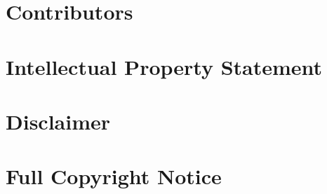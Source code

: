 \documentclass[10pt,a4paper]{article}
\begin{document}
\section{Contributors}


\section{Intellectual Property Statement}


\section{Disclaimer}


\section{Full Copyright Notice}




\end{document}

